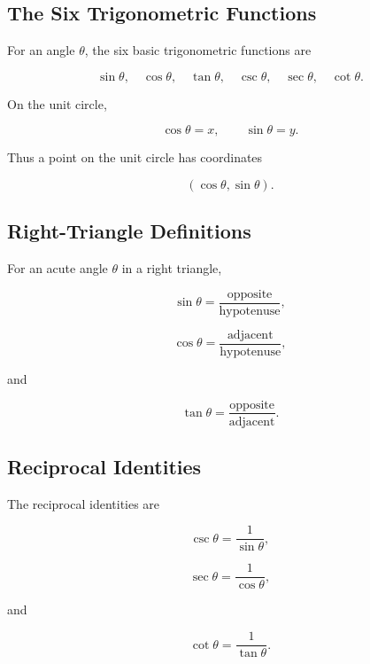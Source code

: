 \subsection{The Six Trigonometric Functions}
\label{subsec:six-trig-functions-reference}

For an angle \(\theta\), the six basic trigonometric functions are

\[
\boxed{
\sin\theta,
\quad
\cos\theta,
\quad
\tan\theta,
\quad
\csc\theta,
\quad
\sec\theta,
\quad
\cot\theta.
}
\]

On the unit circle,

\[
\boxed{
\cos\theta=x,
\qquad
\sin\theta=y.
}
\]

Thus a point on the unit circle has coordinates

\[
\boxed{
(\cos\theta,\sin\theta).
}
\]

\subsection{Right-Triangle Definitions}
\label{subsec:right-triangle-trig-definitions}

For an acute angle \(\theta\) in a right triangle,

\[
\boxed{
\sin\theta
=
\frac{
\text{opposite}
}{
\text{hypotenuse}
},
}
\]

\[
\boxed{
\cos\theta
=
\frac{
\text{adjacent}
}{
\text{hypotenuse}
},
}
\]

and

\[
\boxed{
\tan\theta
=
\frac{
\text{opposite}
}{
\text{adjacent}
}.
}
\]

\subsection{Reciprocal Identities}
\label{subsec:reciprocal-trig-identities}

The reciprocal identities are

\[
\boxed{
\csc\theta
=
\frac{1}{\sin\theta},
}
\]

\[
\boxed{
\sec\theta
=
\frac{1}{\cos\theta},
}
\]

and

\[
\boxed{
\cot\theta
=
\frac{1}{\tan\theta}.
}
\]

